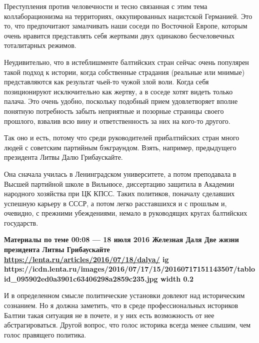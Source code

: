 
Преступления против человечности и тесно связанная с этим тема
коллаборационизма на территориях, оккупированных нацистской Германией. Это то,
что предпочитают замалчивать наши соседи по Восточной Европе, которым очень
нравится представлять себя жертвами двух одинаково бесчеловечных тоталитарных
режимов.

Неудивительно, что в истеблишменте балтийских стран сейчас очень популярен
такой подход к истории, когда собственные страдания (реальные или мнимые)
представляются как результат чьей-то чужой злой воли. Когда себя позиционируют
исключительно как жертву, а в соседе хотят видеть только палача. Это очень
удобно, поскольку подобный прием удовлетворяет вполне понятную потребность
забыть неприятные и позорные страницы своего прошлого, взвалив всю вину и
ответственность за них на кого-то другого.


Так оно и есть, потому что среди руководителей прибалтийских стран много людей
с советским партийным бэкграундом. Взять, например, предыдущего президента
Литвы Далю Грибаускайте.

Она сначала училась в Ленинградском университете, а потом преподавала в Высшей
партийной школе в Вильнюсе, диссертацию защитила в Академии народного хозяйства
при ЦК КПСС. Таких политиков, поначалу сделавших успешную карьеру в СССР, а
потом легко расставшихся и с прошлым и, очевидно, с прежними убеждениями,
немало в руководящих кругах балтийских государств.

\begin{leftbar}
	\bfseries
	Материалы по теме
00:08 — 18 июля 2016
Железная Даля
Две жизни президента Литвы Грибаускайте
\url{https://lenta.ru/articles/2016/07/18/dalya/}
\ifcmt
	ig https://icdn.lenta.ru/images/2016/07/17/15/20160717151143507/tabloid_095902ed0a3901c63406298a2859c235.jpg
	width 0.2
\fi
\end{leftbar}

И в определенном смысле политические установки довлеют над историческим
сознанием. Но я должна заметить, что в среде профессиональных историков Балтии
такая ситуация не в почете, и у них есть возможность от нее абстрагироваться.
Другой вопрос, что голос историка всегда менее слышим, чем голос правящего
политика.
